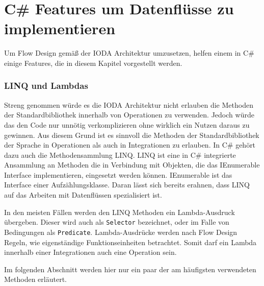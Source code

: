 \section{C\# Features um Datenflüsse zu implementieren}

Um Flow Design gemäß der IODA Architektur umzusetzen, helfen einem in C\# einige Features, die in diesem Kapitel vorgestellt werden.

\subsubsection{LINQ und Lambdas}

Streng genommen würde es die IODA Architektur nicht erlauben die Methoden der
Standardbibliothek innerhalb von Operationen zu verwenden. Jedoch würde das den
Code nur unnötig verkomplizieren ohne wirklich ein Nutzen daraus zu gewinnen.
Aus diesem Grund ist es sinnvoll die Methoden der Standardbibliothek der Sprache
in Operationen als auch in Integrationen zu erlauben.
In C\# gehört dazu auch die Methodensammlung LINQ. 
LINQ ist eine in C\# integrierte Ansammlung an Methoden die in Verbindung mit
Objekten, die das IEnumerable Interface implementieren, eingesetzt werden
können.
IEnumerable ist das Interface einer Aufzählungsklasse. Daran lässt sich bereits erahnen, dass LINQ
auf das Arbeiten mit Datenflüssen spezialisiert ist.

In den meisten Fällen werden den LINQ Methoden ein Lambda-Ausdruck übergeben.
Dieser wird auch als \texttt{Selector} bezeichnet, oder im Falle von Bedingungen als \texttt{Predicate}.
Lambda-Ausdrücke werden nach Flow Design Regeln, wie eigenständige
Funktionseinheiten betrachtet. Somit darf ein Lambda innerhalb einer 
Integrationen auch eine Operation sein.




\bigskip
Im folgenden Abschnitt werden hier nur ein paar der am häufigsten verwendeten Methoden erläutert.

